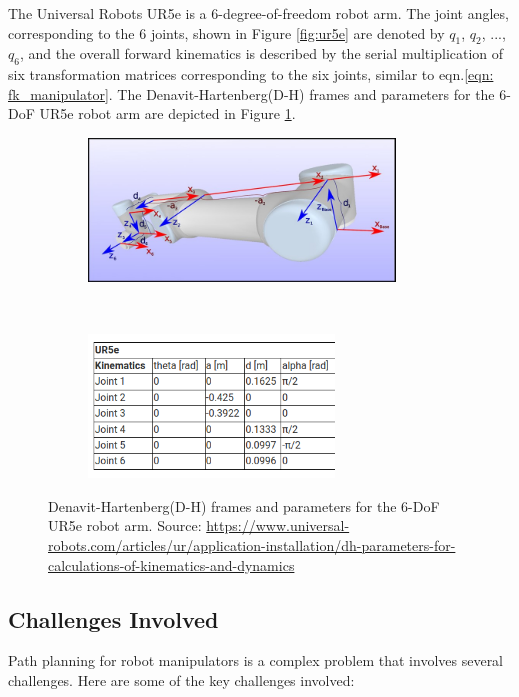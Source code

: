 The Universal Robots UR5e is a 6-degree-of-freedom robot arm. The joint angles, corresponding to the 6 joints, shown in Figure \ref{fig:ur5e} are denoted by $q_1$, $q_2$, ..., $q_6$, and the overall forward kinematics is described by the serial multiplication of six transformation matrices corresponding to the six joints, similar to eqn.\ref{eqn: fk_manipulator}. The Denavit-Hartenberg(D-H) frames and parameters for the 6-DoF UR5e robot arm are depicted in Figure \ref{fig:dh-ur5}.

\begin{figure}[t!]
    \centering
    \begin{subfigure}[t]{0.5\textwidth}
        \centering
        \includegraphics[height=1.5in]{figures/background/dh_ur5ea.jpg}
    \end{subfigure}%
    ~ 
    \begin{subfigure}[t]{0.3\textwidth}
        \centering
        \includegraphics[height=1.5in]{figures/background/dh_ur5eb.png}
    \end{subfigure}
    \caption[DH Parameters for the UR5e Arm]{Denavit-Hartenberg(D-H) frames and parameters for the 6-DoF UR5e robot arm. Source: \scriptsize{\url{https://www.universal-robots.com/articles/ur/application-installation/dh-parameters-for-calculations-of-kinematics-and-dynamics}}}
    \label{fig:dh-ur5}
\end{figure}

\subsection{Challenges Involved}

Path planning for robot manipulators is a complex problem that involves several challenges. Here are some of the key challenges involved:

